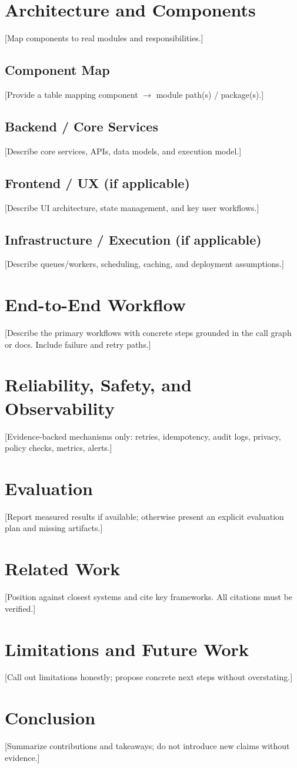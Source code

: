 \documentclass[conference]{IEEEtran}
\begin{document}
\section{Architecture and Components}
[Map components to real modules and responsibilities.]

\subsection{Component Map}
[Provide a table mapping component $\rightarrow$ module path(s) / package(s).]

\subsection{Backend / Core Services}
[Describe core services, APIs, data models, and execution model.]

\subsection{Frontend / UX (if applicable)}
[Describe UI architecture, state management, and key user workflows.]

\subsection{Infrastructure / Execution (if applicable)}
[Describe queues/workers, scheduling, caching, and deployment assumptions.]

\section{End-to-End Workflow}
[Describe the primary workflows with concrete steps grounded in the call graph or docs. Include failure and retry paths.]

\section{Reliability, Safety, and Observability}
[Evidence-backed mechanisms only: retries, idempotency, audit logs, privacy, policy checks, metrics, alerts.]

\section{Evaluation}
[Report measured results if available; otherwise present an explicit evaluation plan and missing artifacts.]

\section{Related Work}
[Position against closest systems and cite key frameworks. All citations must be verified.]

\section{Limitations and Future Work}
[Call out limitations honestly; propose concrete next steps without overstating.]

\section{Conclusion}
[Summarize contributions and takeaways; do not introduce new claims without evidence.]



\end{document}
